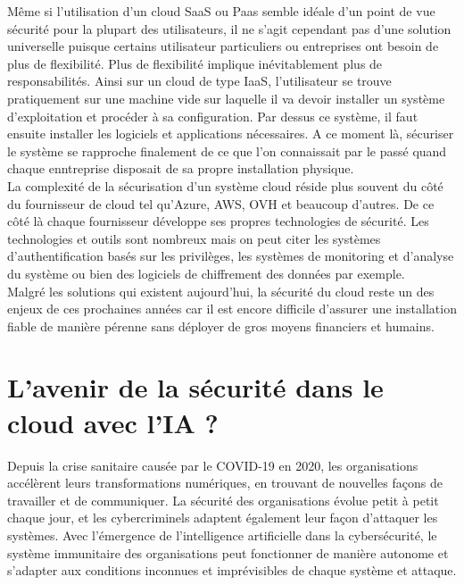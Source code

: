 \documentclass[a4paper, 12pt]{article}
\begin{document}
      Même si l'utilisation d'un cloud SaaS ou Paas semble idéale d'un point 
      de vue sécurité pour la plupart des utilisateurs, il ne s'agit cependant 
      pas d'une solution universelle puisque certains utilisateur particuliers 
      ou entreprises ont besoin de plus de flexibilité. Plus de flexibilité 
      implique inévitablement plus de responsabilités. Ainsi sur un cloud de 
      type IaaS, l'utilisateur se trouve pratiquement sur une machine vide sur 
      laquelle il va devoir installer un système d'exploitation et procéder à 
      sa configuration. Par dessus ce système, il faut ensuite installer les
      logiciels et applications nécessaires. A ce moment là, sécuriser le 
      système se rapproche finalement de ce que l'on connaissait par le passé
      quand chaque enntreprise disposait de sa propre installation physique. \\

      La complexité de la sécurisation d'un système cloud réside plus souvent
      du côté du fournisseur de cloud tel qu'Azure, AWS, OVH et beaucoup 
      d'autres. De ce côté là chaque fournisseur développe ses propres 
      technologies de sécurité. Les technologies et outils sont nombreux mais
      on peut citer les systèmes d'authentification basés sur les privilèges, 
      les systèmes de monitoring et d'analyse du système ou bien des logiciels 
      de chiffrement des données par exemple. \\

      Malgré les solutions qui existent aujourd'hui, la sécurité du cloud
      reste un des enjeux de ces prochaines années car il est encore difficile
      d'assurer une installation fiable de manière pérenne sans déployer de
      gros moyens financiers et humains.

  \section{L'avenir de la sécurité dans le cloud avec l'IA ?}
    Depuis la crise sanitaire causée par le COVID-19 en 2020, les organisations
    accélèrent leurs transformations numériques, en trouvant de nouvelles façons
    de travailler et de communiquer. La sécurité des organisations évolue petit
    à petit chaque jour, et les cybercriminels adaptent également leur façon
    d'attaquer les systèmes. Avec l’émergence de l'intelligence artificielle
    dans la cybersécurité, le système immunitaire des organisations peut
    fonctionner de manière autonome et s'adapter aux conditions inconnues et
    imprévisibles de chaque système et attaque.
\end{document}
